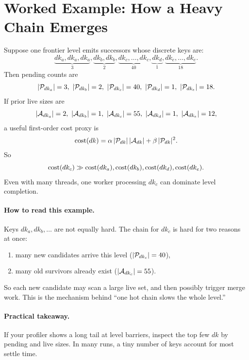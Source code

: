 \section{Worked Example: How a Heavy Chain Emerges}
Suppose one frontier level emits successors whose discrete keys are:
\[
\underbrace{dk_a,dk_a,dk_a}_{3},\underbrace{dk_b,dk_b}_{2},\underbrace{dk_c,\dots,dk_c}_{40},\underbrace{dk_d}_{1},\underbrace{dk_e,\dots,dk_e}_{18}.
\]
Then pending counts are
\[
|\Pend_{dk_a}|=3,\ |\Pend_{dk_b}|=2,\ |\Pend_{dk_c}|=40,\ |\Pend_{dk_d}|=1,\ |\Pend_{dk_e}|=18.
\]
If prior live sizes are
\[
|\Live_{dk_a}|=2,\ |\Live_{dk_b}|=1,\ |\Live_{dk_c}|=55,\ |\Live_{dk_d}|=1,\ |\Live_{dk_e}|=12,
\]
a useful first-order cost proxy is
\[
\mathrm{cost}(dk) = \alpha\,|\mathcal{P}_{dk}|\,|\mathcal{A}_{dk}| + \beta\,|\mathcal{P}_{dk}|^2.
\]
So
\[
\mathrm{cost}(dk_c) \gg \mathrm{cost}(dk_a),\mathrm{cost}(dk_b),\mathrm{cost}(dk_d),\mathrm{cost}(dk_e).
\]
Even with many threads, one worker processing $dk_c$ can dominate level completion.

\paragraph{How to read this example.}
Keys $dk_a,dk_b,\dots$ are not equally hard.
The chain for $dk_c$ is hard for two reasons at once:
\begin{enumerate}
	\item many new candidates arrive this level ($|\mathcal{P}_{dk_c}|=40$),
	\item many old survivors already exist ($|\mathcal{A}_{dk_c}|=55$).
\end{enumerate}
So each new candidate may scan a large live set, and then possibly trigger merge work.
This is the mechanism behind ``one hot chain slows the whole level.''

\paragraph{Practical takeaway.}
If your profiler shows a long tail at level barriers, inspect the top few $dk$ by pending and live sizes.
In many runs, a tiny number of keys account for most settle time.


